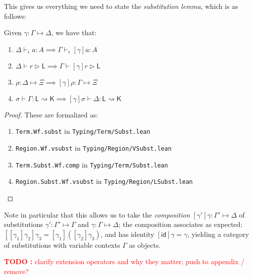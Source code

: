 \documentclass[acmsmall,screen,review]{acmart}
\newcounter{todos}
\newcommand{\TODO}[1]{{
  \stepcounter{todos}
  \begin{center}\large{\textcolor{red}{\textbf{TODO \arabic{todos}:} #1}}\end{center}
}}
\newcommand{\ms}[1]{\ensuremath{\mathsf{#1}}}
\newcommand{\hasty}[4]{#1 \vdash_{#2} #3: {#4}}
\newcommand{\haslb}[3]{#1 \vdash #2 \rhd #3}
\newcommand{\issubst}[3]{#1: #2 \mapsto #3}
\newcommand{\lbsubst}[4]{#1 \vdash #2: #3 \rightsquigarrow #4}
\begin{document}
This gives us everything we need to state the \emph{substitution lemma}, which
is as follows:
\begin{lemma}[Substitution]
  Given $\issubst{\gamma}{\Gamma}{\Delta}$, we have that:
  \begin{enumerate}[label=(\alph*)]
    \item $\hasty{\Delta}{\epsilon}{a}{A} \implies \hasty{\Gamma}{\epsilon}{[\gamma]a}{A}$ 
    \item $\haslb{\Delta}{r}{\ms{L}} \implies \haslb{\Gamma}{[\gamma]r}{\ms{L}}$
    \item $\issubst{\rho}{\Delta}{\Xi} \implies \issubst{[\gamma]\rho}{\Gamma}{\Xi}$
    \item $\lbsubst{\sigma}{\Gamma}{\ms{L}}{\ms{K}} \implies \lbsubst{[\gamma]\sigma}{\Delta}{\ms{L}}{\ms{K}}$
  \end{enumerate}
\end{lemma}
\begin{proof}
  These are formalized as:
  \begin{enumerate}[label=(\alph*)]
    \item \texttt{Term.Wf.subst} in \texttt{Typing/Term/Subst.lean}
    \item \texttt{Region.Wf.vsubst} in \texttt{Typing/Region/VSubst.lean}
    \item \texttt{Term.Subst.Wf.comp} in \texttt{Typing/Term/Subst.lean}
    \item \texttt{Region.Subst.Wf.vsubst} in \texttt{Typing/Region/LSubst.lean}
  \end{enumerate}
\end{proof}
Note in particular that this allows us to take the \emph{composition}
$\issubst{[\gamma']\gamma}{\Gamma'}{\Delta}$ of substitutions $\issubst{\gamma'}{\Gamma'}{\Gamma}$
and $\issubst{\gamma}{\Gamma}{\Delta}$; the composition associates as expected:
$[[\gamma_1]\gamma_2]\gamma_3 = [\gamma_1]([\gamma_2]\gamma_3)$, and has identity $[\ms{id}]\gamma =
\gamma$, yielding a category of substitutions with variable contexts $\Gamma$ as objects.

\TODO{clarify extension operators and why they matter; push to appendix / remove?}
\end{document}
